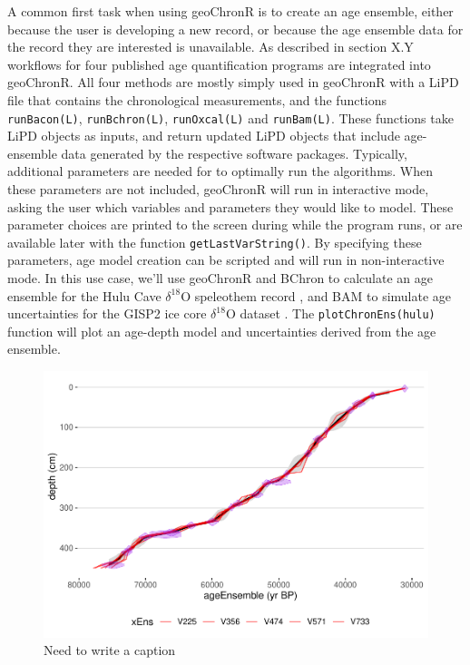 \documentclass[gc, manuscript]{copernicus}
\begin{document}
A common first task when using geoChronR is to create an age ensemble, either because the user is developing a new record, or because the age ensemble data for the record they are interested is unavailable.
As described in section X.Y workflows for four published age quantification programs are integrated into geoChronR.
All four methods are mostly simply used in geoChronR with a LiPD file that contains the chronological measurements, and the functions \texttt{runBacon(L)}, \texttt{runBchron(L)}, \texttt{runOxcal(L)} and \texttt{runBam(L)}.
These functions take LiPD objects as inputs, and return updated LiPD objects that include age-ensemble data generated by the respective software packages.
Typically, additional parameters are needed for to optimally run the algorithms.
When these parameters are not included, geoChronR will run in interactive mode, asking the user which variables and parameters they would like to model.
These parameter choices are printed to the screen during while the program runs, or are available later with the function \texttt{getLastVarString()}.
By specifying these parameters, age model creation can be scripted and will run in non-interactive mode.
In this use case, we'll use geoChronR and BChron \citep{parnell2008flexible} to calculate an age ensemble for the Hulu Cave \(\delta^{18}\)O speleothem record \citep{hulu2001}, and BAM \citep{BAM} to simulate age uncertainties for the GISP2 ice core \(\delta^{18}\)O dataset \citep{alley}.
The \texttt{plotChronEns(hulu)} function will plot an age-depth model and uncertainties derived from the age ensemble.

\begin{figure}
\centering
\includegraphics{geoChronR-paper_files/figure-latex/unnamed-chunk-4-1.pdf}
\caption{\label{fig:unnamed-chunk-4}Need to write a caption}
\end{figure}
\end{document}
